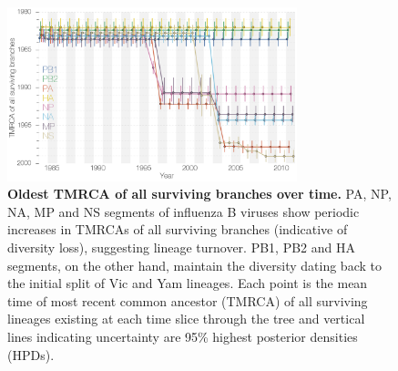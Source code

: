 \documentclass[11pt,oneside,letterpaper]{article}
\begin{document}
\begin{figure}[h]
	\centering		
	\includegraphics[width=0.75\textwidth]{figures/InfB_tmrcaOT_lines.png}
	\caption{\textbf{Oldest TMRCA of all surviving branches over time.}
PA, NP, NA, MP and NS segments of influenza B viruses show periodic increases in TMRCAs of all surviving branches (indicative of diversity loss), suggesting lineage turnover.
PB1, PB2 and HA segments, on the other hand, maintain the diversity dating back to the initial split of Vic and Yam lineages.
Each point is the mean time of most recent common ancestor (TMRCA) of all surviving lineages existing at each time slice through the tree and vertical lines indicating uncertainty are 95\% highest posterior densities (HPDs).}
	\label{tmrcaOT}
\end{figure}
\end{document}
